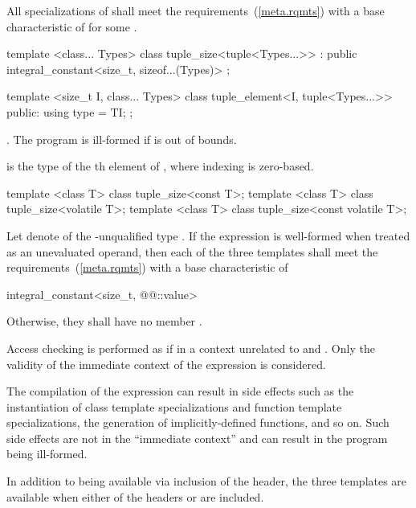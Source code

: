 \begin{itemdescr}
\pnum
\remarks All specializations of  shall meet the
 requirements~(\ref{meta.rqmts}) with a
base characteristic of 
for some .
\end{itemdescr}

%
\begin{itemdecl}
template <class... Types>
  class tuple_size<tuple<Types...>> : public integral_constant<size_t, sizeof...(Types)> { };
\end{itemdecl}

%
\begin{itemdecl}
template <size_t I, class... Types>
  class tuple_element<I, tuple<Types...>> {
  public:
    using type = TI;
  };
\end{itemdecl}

\begin{itemdescr}
\pnum
\requires {}.
The program is ill-formed if  is out of bounds.

\pnum
\ctype {} is the
type of the th element of ,
where indexing is zero-based.
\end{itemdescr}

%
\begin{itemdecl}
template <class T> class tuple_size<const T>;
template <class T> class tuple_size<volatile T>;
template <class T> class tuple_size<const volatile T>;
\end{itemdecl}

\begin{itemdescr}
\pnum
Let  denote  of the \cv-unqualified type .
If the expression  is well-formed
when treated as an unevaluated operand, then each
of the three templates shall meet the  requirements~(\ref{meta.rqmts})
with a base characteristic of
\begin{codeblock}
integral_constant<size_t, @@::value>
\end{codeblock}
Otherwise, they shall have no member .

\pnum
Access checking is performed as if in a context
unrelated to  and .
Only the validity of the immediate context of the expression is considered.
\begin{note}
The compilation of the expression can result in side effects
such as the instantiation of class template specializations and
function template specializations, the generation of implicitly-defined functions, and so on.
Such side effects are not in the ``immediate context'' and
can result in the program being ill-formed.
\end{note}

\pnum
In addition to being available via inclusion of the  header,
the three templates are available when either of the headers  or
 are included.
\end{itemdescr}


